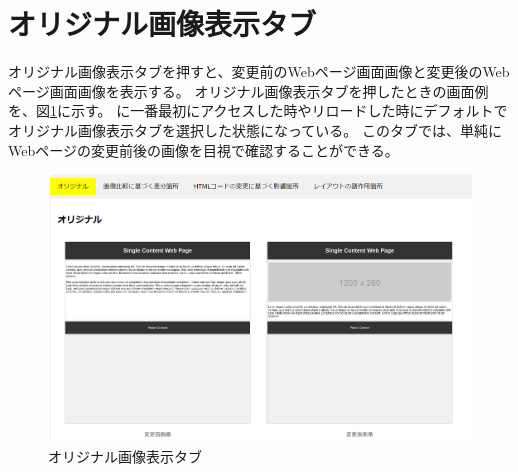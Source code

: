 \section{オリジナル画像表示タブ}\label{subsec:original_tab}
オリジナル画像表示タブを押すと、変更前のWebページ画面画像と変更後のWebページ画面画像を表示する。
オリジナル画像表示タブを押したときの画面例を、図\ref{fig: Appearance_original_tab}に示す。
\toolName に一番最初にアクセスした時やリロードした時にデフォルトでオリジナル画像表示タブを選択した状態になっている。
このタブでは、単純にWebページの変更前後の画像を目視で確認することができる。
\begin{figure}[tp]
	\begin{center}
		\includegraphics[width=1.0\columnwidth]{image/3_original_tab.png}
		\caption{オリジナル画像表示タブ}
		\label{fig: Appearance_original_tab}
	\end{center}
\end{figure}



